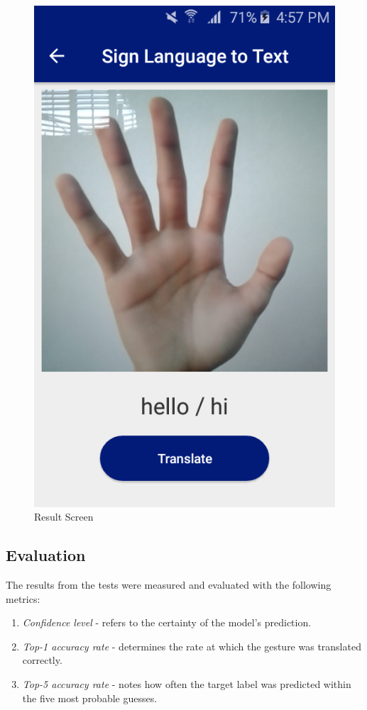 \documentclass[journal]{./IEEE/IEEEtran}
\begin{document}
\begin{figure}[ht!]
    \centering
    \includegraphics[width=0.75\linewidth]{./images/screen_stt_result.png}
    \caption{Result Screen}
    \label{fig:stt_result}
\end{figure}


\subsection{Evaluation}
The results from the tests were measured and evaluated with the following metrics:
\begin{enumerate}
    \item \textit{Confidence level} - refers to the certainty of the model's prediction.
    \item \textit{Top-1 accuracy rate} - determines the rate at which the gesture was translated correctly.
    \item \textit{Top-5 accuracy rate} - notes how often the target label was predicted within the five most probable guesses.
\end{enumerate}
\end{document}
